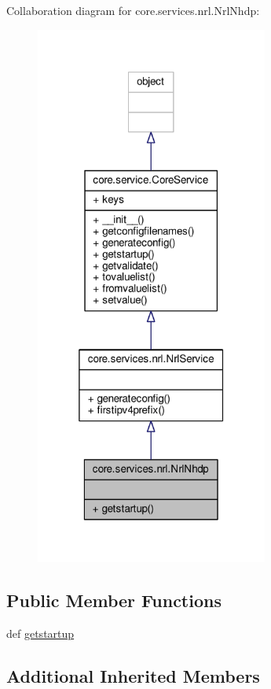 Collaboration diagram for core.\+services.\+nrl.\+Nrl\+Nhdp\+:
\nopagebreak
\begin{figure}[H]
\begin{center}
\leavevmode
\includegraphics[width=217pt]{classcore_1_1services_1_1nrl_1_1_nrl_nhdp__coll__graph}
\end{center}
\end{figure}
\subsection*{Public Member Functions}
\begin{DoxyCompactItemize}
\item 
def \hyperlink{classcore_1_1services_1_1nrl_1_1_nrl_nhdp_ae7196449ffbd30566999bc5ea16b6e98}{getstartup}
\end{DoxyCompactItemize}
\subsection*{Additional Inherited Members}


